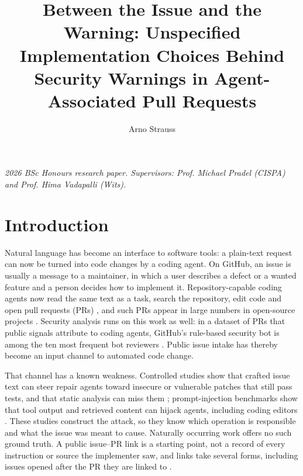 \documentclass[acmsmall,screen,nonacm]{acmart}
\title[Between the Issue and the Warning]{Between the Issue and the Warning: Unspecified Implementation Choices Behind Security Warnings in Agent-Associated Pull Requests}
\author{Arno Strauss}
\affiliation{\institution{School of Computer Science and Applied Mathematics, University of the Witwatersrand}\city{Johannesburg}\country{South Africa}}
\begin{document}
\maketitle
\noindent\textit{2026 BSc Honours research paper. Supervisors: Prof. Michael Pradel (CISPA) and Prof. Hima Vadapalli (Wits).}

\section{Introduction}

Natural language has become an interface to software tools: a plain-text request can now be turned into code changes by a coding agent. On GitHub, an issue is usually a message to a maintainer, in which a user describes a defect or a wanted feature and a person decides how to implement it. Repository-capable coding agents now read the same text as a task, search the repository, edit code and open pull requests (PRs) \cite{b9,b20,b22,b25}, and such PRs appear in large numbers in open-source projects \cite{b11,b21}. Security analysis runs on this work as well: in a dataset of PRs that public signals attribute to coding agents, GitHub's rule-based security bot is among the ten most frequent bot reviewers \cite{b11}. Public issue intake has thereby become an input channel to automated code change.

That channel has a known weakness. Controlled studies show that crafted issue text can steer repair agents toward insecure or vulnerable patches that still pass tests, and that static analysis can miss them \cite{b3,b16}; prompt-injection benchmarks show that tool output and retrieved content can hijack agents, including coding editors \cite{b6,b12,b24}. These studies construct the attack, so they know which operation is responsible and what the issue was meant to cause. Naturally occurring work offers no such ground truth. A public issue--PR link is a starting point, not a record of every instruction or source the implementer saw, and links take several forms, including issues opened after the PR they are linked to \cite{b5}.
\end{document}
